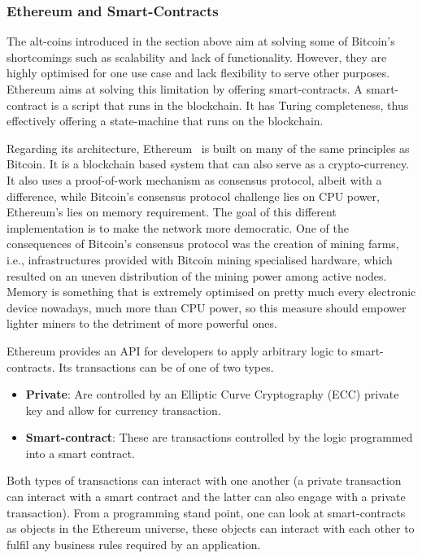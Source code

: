 \documentclass[letterpaper,twocolumn,10pt]{article}
\begin{document}
\subsubsection{Ethereum and Smart-Contracts}
\label{rel:ethereum}

\noindent The alt-coins introduced in the section above aim at solving some of Bitcoin's shortcomings such as scalability and lack of functionality. However, they are highly optimised for one use case and lack flexibility to serve other purposes. Ethereum aims at solving this limitation by offering smart-contracts. A smart-contract is a script that runs in the blockchain. It has Turing completeness, thus effectively offering a state-machine that runs on the blockchain.

Regarding its architecture, Ethereum~\cite{Wood:2014ur,Buterin:2013ux} is built on many of the same principles as Bitcoin. It is a blockchain based system that can also serve as a crypto-currency. It also uses a proof-of-work mechanism as consensus protocol, albeit with a difference, while Bitcoin's consensus protocol challenge lies on CPU power, Ethereum's lies on memory requirement. The goal of this different implementation is to make the network more democratic. One of the consequences of Bitcoin's consensus protocol was the creation of mining farms, i.e., infrastructures provided with Bitcoin mining specialised hardware, which resulted on an uneven distribution of the mining power among active nodes. Memory is something that is extremely optimised on pretty much every electronic device nowadays, much more than CPU power, so this measure should empower lighter miners to the detriment of more powerful ones.

Ethereum provides an API for developers to apply arbitrary logic to smart-contracts. Its transactions can be of one of two types.

\begin{itemize}
\item \textbf{Private}: Are controlled by an Elliptic Curve Cryptography (ECC) private key and allow for currency transaction.
\item \textbf{Smart-contract}: These are transactions controlled by the logic programmed into a smart contract.
\end{itemize}

Both types of transactions can interact with one another (a private transaction can interact with a smart contract and the latter can also engage with a private transaction).
From a programming stand point, one can look at smart-contracts as objects in the Ethereum universe, these objects can interact with each other to fulfil any business rules required by an application.
\end{document}
